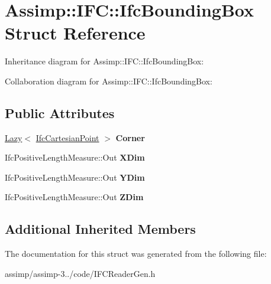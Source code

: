 \hypertarget{struct_assimp_1_1_i_f_c_1_1_ifc_bounding_box}{\section{Assimp\+:\+:I\+F\+C\+:\+:Ifc\+Bounding\+Box Struct Reference}
\label{struct_assimp_1_1_i_f_c_1_1_ifc_bounding_box}
}


Inheritance diagram for Assimp\+:\+:I\+F\+C\+:\+:Ifc\+Bounding\+Box\+:


Collaboration diagram for Assimp\+:\+:I\+F\+C\+:\+:Ifc\+Bounding\+Box\+:
\subsection*{Public Attributes}
\begin{DoxyCompactItemize}
\item 
\hypertarget{struct_assimp_1_1_i_f_c_1_1_ifc_bounding_box_acdbc1b5292fbac133e2d590fd69836c1}{\hyperlink{struct_assimp_1_1_s_t_e_p_1_1_lazy}{Lazy}$<$ \hyperlink{struct_assimp_1_1_i_f_c_1_1_ifc_cartesian_point}{Ifc\+Cartesian\+Point} $>$ {\bfseries Corner}}\label{struct_assimp_1_1_i_f_c_1_1_ifc_bounding_box_acdbc1b5292fbac133e2d590fd69836c1}

\item 
\hypertarget{struct_assimp_1_1_i_f_c_1_1_ifc_bounding_box_acec3c8ab5912fd63bcc27ca1670c7a07}{Ifc\+Positive\+Length\+Measure\+::\+Out {\bfseries X\+Dim}}\label{struct_assimp_1_1_i_f_c_1_1_ifc_bounding_box_acec3c8ab5912fd63bcc27ca1670c7a07}

\item 
\hypertarget{struct_assimp_1_1_i_f_c_1_1_ifc_bounding_box_a1b000c86939169bf5a544f541863d131}{Ifc\+Positive\+Length\+Measure\+::\+Out {\bfseries Y\+Dim}}\label{struct_assimp_1_1_i_f_c_1_1_ifc_bounding_box_a1b000c86939169bf5a544f541863d131}

\item 
\hypertarget{struct_assimp_1_1_i_f_c_1_1_ifc_bounding_box_a6564e6ff04c53a4ce70d1392f822a2bb}{Ifc\+Positive\+Length\+Measure\+::\+Out {\bfseries Z\+Dim}}\label{struct_assimp_1_1_i_f_c_1_1_ifc_bounding_box_a6564e6ff04c53a4ce70d1392f822a2bb}

\end{DoxyCompactItemize}
\subsection*{Additional Inherited Members}


The documentation for this struct was generated from the following file\+:\begin{DoxyCompactItemize}
\item 
assimp/assimp-\/3../code/I\+F\+C\+Reader\+Gen.\+h\end{DoxyCompactItemize}
